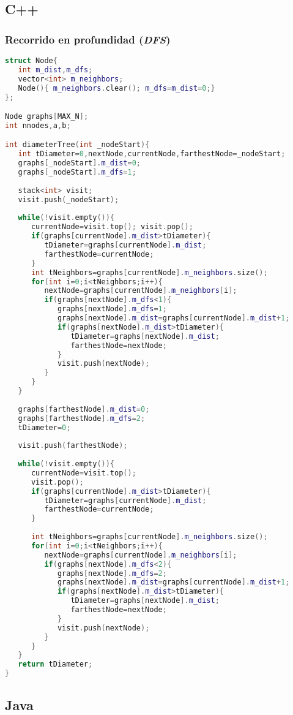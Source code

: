\subsection{C++}

\subsubsection{Recorrido en profundidad (\emph{DFS})}
\begin{lstlisting}[language=C++]
struct Node{
   int m_dist,m_dfs;
   vector<int> m_neighbors;
   Node(){ m_neighbors.clear(); m_dfs=m_dist=0;}
};

Node graphs[MAX_N];
int nnodes,a,b;

int diameterTree(int _nodeStart){
   int tDiameter=0,nextNode,currentNode,farthestNode=_nodeStart;
   graphs[_nodeStart].m_dist=0;
   graphs[_nodeStart].m_dfs=1;
	
   stack<int> visit;
   visit.push(_nodeStart);
	
   while(!visit.empty()){
      currentNode=visit.top(); visit.pop();
      if(graphs[currentNode].m_dist>tDiameter){
         tDiameter=graphs[currentNode].m_dist;
         farthestNode=currentNode;
      }
      int tNeighbors=graphs[currentNode].m_neighbors.size();
      for(int i=0;i<tNeighbors;i++){
         nextNode=graphs[currentNode].m_neighbors[i];
         if(graphs[nextNode].m_dfs<1){
            graphs[nextNode].m_dfs=1;
            graphs[nextNode].m_dist=graphs[currentNode].m_dist+1;
            if(graphs[nextNode].m_dist>tDiameter){
               tDiameter=graphs[nextNode].m_dist;
               farthestNode=nextNode;
            }
            visit.push(nextNode);
         }
      }
   }
   
   graphs[farthestNode].m_dist=0;
   graphs[farthestNode].m_dfs=2;
   tDiameter=0;
	
   visit.push(farthestNode);
	
   while(!visit.empty()){
      currentNode=visit.top();
      visit.pop();
      if(graphs[currentNode].m_dist>tDiameter){
         tDiameter=graphs[currentNode].m_dist;
         farthestNode=currentNode;
      }
		
      int tNeighbors=graphs[currentNode].m_neighbors.size();
      for(int i=0;i<tNeighbors;i++){
         nextNode=graphs[currentNode].m_neighbors[i];
         if(graphs[nextNode].m_dfs<2){
            graphs[nextNode].m_dfs=2;
            graphs[nextNode].m_dist=graphs[currentNode].m_dist+1;
            if(graphs[nextNode].m_dist>tDiameter){
               tDiameter=graphs[nextNode].m_dist;
               farthestNode=nextNode;
            }
            visit.push(nextNode);
         }
      }
   }
   return tDiameter;
}
\end{lstlisting} 

\subsection{Java}